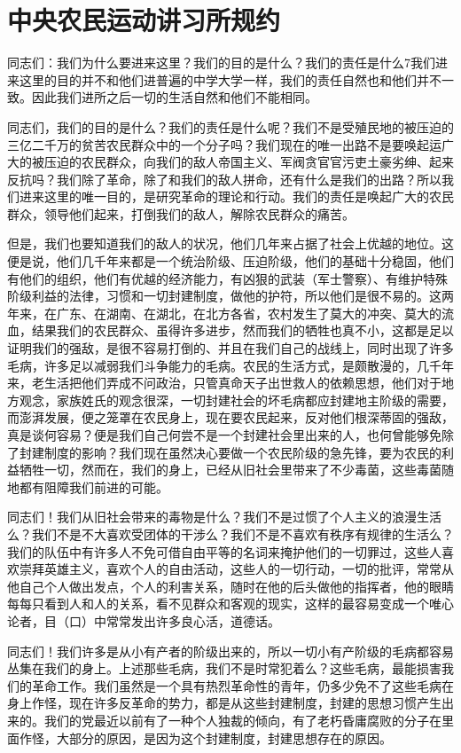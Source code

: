 \section[中央农民运动讲习所规约（一九二六年十月）]{中央农民运动讲习所规约}


同志们：我们为什么要进来这里？我们的目的是什么？我们的责任是什么7我们进来这里的目的并不和他们进普遍的中学大学一样，我们的责任自然也和他们并不一致。因此我们进所之后一切的生活自然和他们不能相同。

同志们，我们的目的是什么？我们的责任是什么呢？我们不是受殖民地的被压迫的三亿二千万的贫苦农民群众中的一个分子吗？我们现在的唯一出路不是要唤起运广大的被压迫的农民群众，向我们的敌人帝国主义、军阀贪官官污吏土豪劣绅、起来反抗吗？我们除了革命，除了和我们的敌人拼命，还有什么是我们的出路？所以我们进来这里的唯一目的，是研究革命的理论和行动。我们的责任是唤起广大的农民群众，领导他们起来，打倒我们的敌人，解除农民群众的痛苦。

但是，我们也要知道我们的敌人的状况，他们几年来占据了社会上优越的地位。这便是说，他们几千年来都是一个统治阶级、压迫阶级，他们的基础十分稳固，他们有他们的组织，他们有优越的经济能力，有凶狠的武装（军士警察）、有维护特殊阶级利益的法律，习惯和一切封建制度，做他的护符，所以他们是很不易的。这两年来，在广东、在湖南、在湖北，在北方各省，农村发生了莫大的冲突、莫大的流血，结果我们的农民群众、虽得许多进步，然而我们的牺牲也真不小，这都是足以证明我们的强敌，是很不容易打倒的、并且在我们自己的战线上，同时出现了许多毛病，许多足以减弱我们斗争能力的毛病。农民的生活方式，是颇散漫的，几千年来，老生活把他们弄成不问政治，只管真命天子出世救人的依赖思想，他们对于地方观念，家族姓氏的观念很深，一切封建社会的坏毛病都应封建地主阶级的需要，而澎湃发展，便之笼罩在农民身上，现在要农民起来，反对他们根深蒂固的强敌，真是谈何容易？便是我们自己何尝不是一个封建社会里出来的人，也何曾能够免除了封建制度的影响？我们现在虽然决心要做一个农民阶级的急先锋，要为农民的利益牺牲一切，然而在，我们的身上，已经从旧社会里带来了不少毒菌，这些毒菌随地都有阻障我们前进的可能。

同志们！我们从旧社会带来的毒物是什么？我们不是过惯了个人主义的浪漫生活么？我们不是不大喜欢受团体的干涉么？我们不是不喜欢有秩序有规律的生活么？我们的队伍中有许多人不免可借自由平等的名词来掩护他们的一切罪过，这些人喜欢崇拜英雄主义，喜欢个人的自由活动，这些人的一切行动，一切的批评，常常从他自己个人做出发点，个人的利害关系，随时在他的后头做他的指挥者，他的眼睛每每只看到人和人的关系，看不见群众和客观的现实，这样的最容易变成一个唯心论者，目（口）中常常发出许多良心活，道德话。

同志们！我们许多是从小有产者的阶级出来的，所以一切小有产阶级的毛病都容易丛集在我们的身上。上述那些毛病，我们不是时常犯着么？这些毛病，最能损害我们的革命工作。我们虽然是一个具有热烈革命性的青年，仍多少免不了这些毛病在身上作怪，现在许多反革命的势力，都是从这些封建制度，封建的思想习惯产生出来的。我们的党最近以前有了一种个人独裁的倾向，有了老朽昏庸腐败的分子在里面作怪，大部分的原因，是因为这个封建制度，封建思想存在的原因。

